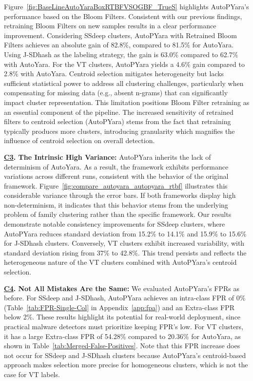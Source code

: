 Figure~\ref{fig:BaseLineAutoYaraBoxRTBFVSOGBF_TrueS} highlights AutoPYara’s performance based on the Bloom Filters. Consistent with our previous findings, retraining Bloom Filters on new samples results in a clear performance improvement. Considering SSdeep clusters, AutoPYara with Retrained Bloom Filters achieves an absolute gain of 82.8\%, compared to 81.5\% for AutoYara. Using J-SDhash as the labeling strategy, the gain is 63.0\% compared to 62.7\% with AutoYara. For the VT clusters, AutoPYara yields a 4.6\% gain compared to 2.8\% with AutoYara. Centroid selection mitigates heterogeneity but lacks sufficient statistical power to address all clustering challenges, particularly when compensating for missing data (e.g., absent n-grams) that can significantly impact cluster representation. This limitation positions Bloom Filter retraining as an essential component of the pipeline. The increased sensitivity of retrained filters to centroid selection (AutoPYara) stems from the fact that retraining typically produces more clusters, introducing granularity which magnifies the influence of centroid selection on overall detection.

\noindent\textbf{\underline{C3}. The Intrinsic High Variance:}
AutoPYara inherits the lack of determinism of AutoYara. As a result, the framework exhibits performance variations across different runs, consistent with the behavior of the original framework. Figure~\ref{fig:compare_autoyara_autopyara_rtbf} illustrates this considerable variance through the error bars. If both frameworks display high non-determinism, it indicates that this behavior stems from the underlying problem of family clustering rather than the specific framework. Our results demonstrate notable consistency improvements for SSdeep clusters, where AutoPYara reduces standard deviation from 15.2\% to 14.1\% and 15.9\% to 15.6\% for J-SDhash clusters. Conversely, VT clusters exhibit increased variability, with standard deviation rising from 37\% to 42.8\%. This trend persists and reflects the heterogeneous nature of the VT clusters combined with AutoPYara’s centroid selection.




\noindent\textbf{\underline{C4}. Not All Mistakes Are the Same:} We evaluated AutoPYara's FPRs as before. For SSdeep and J-SDhash, AutoPYara achieves an intra-class FPR of 0\% (Table~\ref{tab:FPR-Single-Col} in Appendix~\ref{app:fpa}) and an Extra-class FPR below 2\%. These results highlight its potential for real-world deployment, since practical malware detectors must prioritize keeping FPR's low. For VT clusters, it has a large Extra-class FPR of 54.28\% compared to 20.36\% for AutoYara, as shown in Table~\ref{tab:Merged-False-Positives}. Note that this FPR increase does not occur for SSdeep and J-SDhash clusters because AutoPYara’s centroid-based approach makes selection more precise for homogeneous clusters, which is not the case for VT labels.


